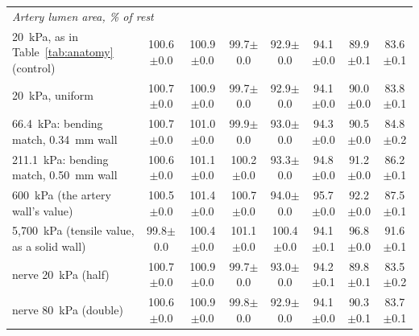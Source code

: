 \begin{table}[t]
\begin{tabular}{lccccccc}
\hline
\multicolumn{8}{l}{\textit{Artery lumen area, \% of rest}} \\
20~kPa, as in Table~\ref{tab:anatomy} (control) & 100.6$\pm$0.0 & 100.9$\pm$0.0 & 99.7$\pm$0.0 & 92.9$\pm$0.0 & 94.1$\pm$0.0 & 89.9$\pm$0.1 & 83.6$\pm$0.1 \\
20~kPa, uniform & 100.7$\pm$0.0 & 100.9$\pm$0.0 & 99.7$\pm$0.0 & 92.9$\pm$0.0 & 94.1$\pm$0.0 & 90.0$\pm$0.0 & 83.8$\pm$0.1 \\
66.4~kPa: bending match, 0.34~mm wall & 100.7$\pm$0.0 & 101.0$\pm$0.0 & 99.9$\pm$0.0 & 93.0$\pm$0.0 & 94.3$\pm$0.0 & 90.5$\pm$0.0 & 84.8$\pm$0.2 \\
211.1~kPa: bending match, 0.50~mm wall & 100.6$\pm$0.0 & 101.1$\pm$0.0 & 100.2$\pm$0.0 & 93.3$\pm$0.0 & 94.8$\pm$0.0 & 91.2$\pm$0.0 & 86.2$\pm$0.1 \\
600~kPa (the artery wall's value) & 100.5$\pm$0.0 & 101.4$\pm$0.0 & 100.7$\pm$0.0 & 94.0$\pm$0.0 & 95.7$\pm$0.0 & 92.2$\pm$0.0 & 87.5$\pm$0.1 \\
5,700~kPa (tensile value, as a solid wall) & 99.8$\pm$0.0 & 100.4$\pm$0.0 & 101.1$\pm$0.0 & 100.4$\pm$0.0 & 94.1$\pm$0.1 & 96.8$\pm$0.0 & 91.6$\pm$0.1 \\
nerve 20~kPa (half) & 100.7$\pm$0.0 & 100.9$\pm$0.0 & 99.7$\pm$0.0 & 93.0$\pm$0.0 & 94.2$\pm$0.1 & 89.8$\pm$0.1 & 83.5$\pm$0.2 \\
nerve 80~kPa (double) & 100.6$\pm$0.0 & 100.9$\pm$0.0 & 99.8$\pm$0.0 & 92.9$\pm$0.0 & 94.1$\pm$0.0 & 90.3$\pm$0.1 & 83.7$\pm$0.1 \\
\hline
\end{tabular}
\end{table}
